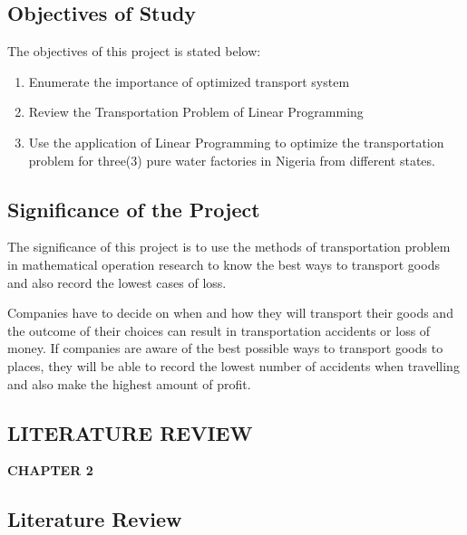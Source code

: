 \documentclass{article}
\begin{document}
\newpage

\begin{center}
\subsection{Objectives of Study}
\end{center}

{\large The objectives of this project is stated below: \newline
\begin{enumerate}
\item Enumerate the importance of optimized transport system
\item Review the Transportation Problem of Linear Programming
\item Use the application of Linear Programming to optimize the transportation problem for three(3) pure water factories in Nigeria from different states.
\end{enumerate}}
	
\newpage

\begin{center}
\subsection{Significance of the Project}
\end{center}

{\large The significance of this project is to use the methods of transportation problem in mathematical operation research to know the best ways to transport goods and also record the lowest cases of loss.

Companies have to decide on when and how they will transport their goods and the outcome of their choices can result in transportation accidents or loss of money. If companies are aware of the best possible ways to transport goods to places, they will be able to record the lowest number of accidents when travelling and also make the highest amount of profit.}

\newpage

\begin{center}
	\section{LITERATURE REVIEW}
	\textbf{CHAPTER 2}
\end{center}
\subsection{Literature Review}
\end{document}
